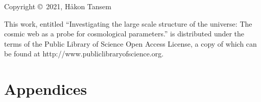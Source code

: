 \documentclass[a4paper,11pt]{book}
\title{\mintittel}
\author{Håkon Tansem}
\date{\today}
\newcommand{\mintittel}{Investigating the large scale structure of the universe: The cosmic web as a probe for cosmological parameters.}
\begin{document}

\vspace*{17cm}
\noindent Copyright \copyright$\,$ 2021, Håkon Tansem
\vspace{4mm}

\noindent This work, entitled ``\mintittel'' is distributed under the
terms of the Public Library of Science Open Access License, a copy of which can be found at
http://www.publiclibraryofscience.org.



\tableofcontents

\listoffigures
\newpage
\thispagestyle{empty}
\mbox{}

\newpage
\pagestyle{fancyplain}











	
\part*{Appendices}
\appendix
%




%
\end{document}
